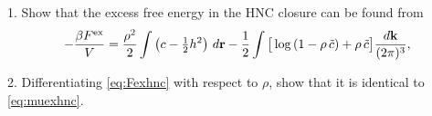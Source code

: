 \documentclass[12pt]{book}
\begin{document}



1. Show that the excess free energy in the HNC closure
can be found from\cite{morita1958, morita1960, singer1985}
\begin{align}
    - \frac{ \beta { { F }^{ \mathrm{ex} } } } { V }
    = \frac{\rho^2}{2} \int \left( c - \tfrac{1}{2} h^2 \right) \, d\boldsymbol{\mathbf{r}}
      - \frac{1}{2} \int  \big[
              \log\left( 1 - \rho \, \tilde{c} \right)
                           + \rho \, \tilde{c}
                         \big]  \frac{ d \boldsymbol{\mathbf{k}} }{(2\pi)^3},
\label{eq:Fexhnc}
\end{align}

2. Differentiating \eqref{eq:Fexhnc} with respect to $\rho$,
show that it is identical to \eqref{eq:muexhnc}.


%
%
%





\end{document}
